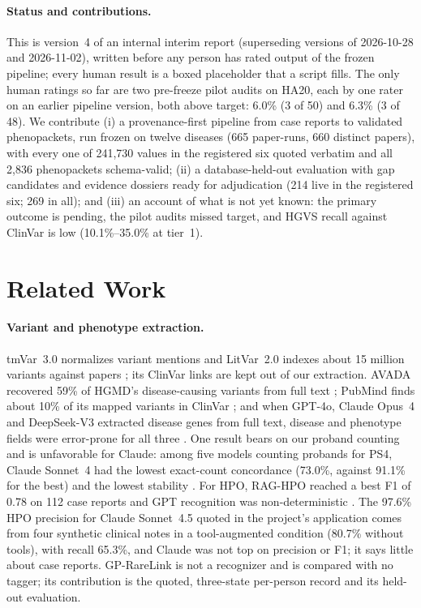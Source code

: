 \documentclass{article} %
\begin{document}
\paragraph{Status and contributions.} This is version~4 of an internal interim report (superseding versions of 2026-10-28 and 2026-11-02), written before any person has rated output of the frozen pipeline; every human result is a boxed placeholder that a script fills. The only human ratings so far are two pre-freeze pilot audits on HA20, each by one rater on an earlier pipeline version, both above target: 6.0\% (3 of 50) and 6.3\% (3 of 48). We contribute (i) a provenance-first pipeline from case reports to validated phenopackets, run frozen on twelve diseases (665 paper-runs, 660 distinct papers), with every one of 241,730 values in the registered six quoted verbatim and all 2,836 phenopackets schema-valid; (ii) a database-held-out evaluation with gap candidates and evidence dossiers ready for adjudication (214 live in the registered six; 269 in all); and (iii) an account of what is not yet known: the primary outcome is pending, the pilot audits missed target, and HGVS recall against ClinVar is low (10.1\%--35.0\% at tier~1).

\section{Related Work}
\label{sec:related_work}
\paragraph{Variant and phenotype extraction.} tmVar~3.0 normalizes variant mentions \citep{wei2022_tmvar3} and LitVar~2.0 indexes about 15 million variants against papers \citep{allot2023_litvar2}; its ClinVar links are kept out of our extraction. AVADA recovered 59\% of HGMD's disease-causing variants from full text \citep{birgmeier2020_avada}; PubMind finds about 10\% of its mapped variants in ClinVar \citep{wang2025_pubmind}; and when GPT-4o, Claude Opus~4 and DeepSeek-V3 extracted disease genes from full text, disease and phenotype fields were error-prone for all three \citep{yin2025_llm_disease_genes}. One result bears on our proband counting and is unfavorable for Claude: among five models counting probands for PS4, Claude Sonnet~4 had the lowest exact-count concordance (73.0\%, against 91.1\% for the best) and the lowest stability \citep{murugan2026_reasoning_llm_ps4}. For HPO, RAG-HPO reached a best F1 of 0.78 on 112 case reports \citep{garcia2025_raghpo} and GPT recognition was non-deterministic \citep{groza2024_gpt_hpo}. The 97.6\% HPO precision for Claude Sonnet~4.5 quoted in the project's application \citep{larsen2026_hpo_mcp} comes from four synthetic clinical notes in a tool-augmented condition (80.7\% without tools), with recall 65.3\%, and Claude was not top on precision or F1; it says little about case reports. GP-RareLink is not a recognizer and is compared with no tagger; its contribution is the quoted, three-state per-person record and its held-out evaluation.
\end{document}
